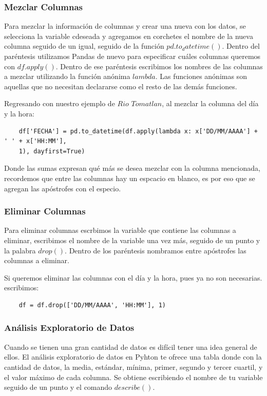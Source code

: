 \documentclass{article}
\begin{document}
\subsubsection{Mezclar Columnas}
    Para mezclar la información de columnas y crear una nueva con los datos, se selecciona la variable cdeseada y agregamos en corchetes el nombre de la nueva columna seguido de un igual, seguido de la función $pd.to_datetime()$. Dentro del paréntesis utilizamos Pandas de nuevo para especificar cuáles columnas queremos con $df.apply()$. Dentro de ese paréntesis escribimos los nombres de las columnas a mezclar utilizando la función anónima $lambda$. Las funciones anónimas son aquellas que no necesitan declararse como el resto de las demás funciones. 
    
    Regresando con nuestro ejemplo de $Rio$ $Tomatlan$, al mezclar la columna del día y la hora:
    
    \begin{verbatim}
    df['FECHA'] = pd.to_datetime(df.apply(lambda x: x['DD/MM/AAAA'] + ' ' + x['HH:MM'], 
    1), dayfirst=True)
    \end{verbatim}
    
	Donde las sumas expresan qué más se desea mezclar con la columna mencionada, recordemos que entre las columnas hay un espcacio en blanco, es por eso que se agregan las apóstrofes con el especio.
    
\subsubsection{Eliminar Columnas}
    Para eliminar columnas escrbimos la variable que contiene las columnas a eliminar, escribimos el nombre de la variable una vez más, seguido de un punto y la palabra $drop()$. Dentro de los paréntesis nombramos entre apóstrofes las columnas a eliminar.
    
    Si queremos eliminar las columnas con el día y la hora, pues ya no son necesarias. escribimos:
    
    \begin{verbatim}
    df = df.drop(['DD/MM/AAAA', 'HH:MM'], 1)
    \end{verbatim}

\subsubsection{Análisis Exploratorio de Datos}
Cuando se tienen una gran cantidad de datos es difícil tener una idea general de ellos. El análisis exploratorio de datos en Pyhton te ofrece una tabla donde con la cantidad de datos, la media, estándar, mínima, primer, segundo y tercer cuartil, y el valor máximo de cada columna. Se obtiene escribiendo el nombre de tu variable seguido de un punto y el comando $describe()$.
    
\end{document}
